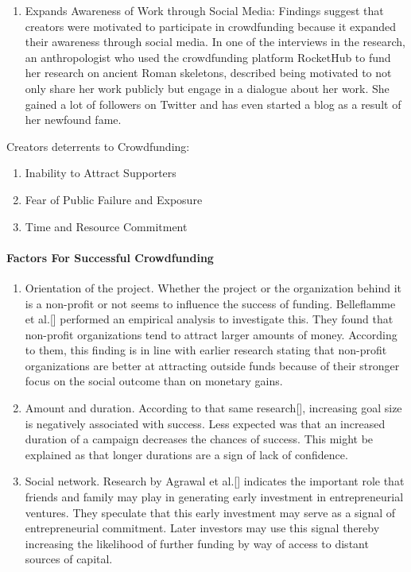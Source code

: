\begin{enumerate}
      \item Expands Awareness  of Work  through Social Media:
            Findings suggest that creators were motivated to
            participate in crowdfunding because it expanded their awareness through social media. In one of the
            interviews in the research, an anthropologist who used the crowdfunding platform RocketHub to fund
            her research on ancient Roman skeletons, described being motivated to not only share her work publicly but engage in a dialogue about her work. She gained a lot of followers on Twitter and has even
            started a blog as a result of her newfound fame.

\end{enumerate}

Creators deterrents to Crowdfunding:
\begin{enumerate}
      \item Inability to Attract Supporters
      \item Fear of Public Failure and Exposure
      \item Time and Resource Commitment
\end{enumerate}

\paragraph*{Factors For Successful Crowdfunding}
\begin{enumerate}
      \item Orientation of the project. Whether the project or the organization behind it is a non-profit or not
            seems to influence the success of funding. Belleflamme et al.[\cite{doi:10.1080/13691066.2013.785151}] performed an empirical analysis
            to investigate this. They found that non-profit organizations tend to attract larger amounts of money.
            According to them, this finding is in line with earlier research stating that non-profit organizations
            are better at attracting outside funds because of their stronger focus on the social outcome than on
            monetary gains.

      \item Amount and duration. According to that same research[\cite{doi:10.1080/13691066.2013.785151}], increasing goal size is negatively associated
            with success. Less expected was that an increased duration of a campaign decreases the chances of
            success. This might be explained as that longer durations are a sign of lack of confidence.

      \item Social network. Research by Agrawal et al.[\cite{NBERw16820}] indicates the important role that friends and family may
            play in generating early investment in entrepreneurial ventures. They speculate that this early investment may serve as a signal of entrepreneurial commitment. Later investors may use this signal thereby
            increasing the likelihood of further funding by way of access to distant sources of capital.
\end{enumerate}


